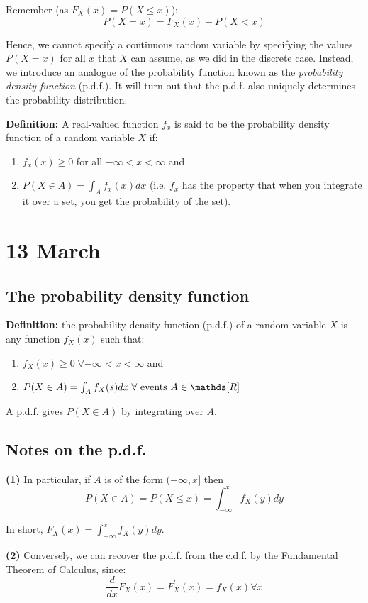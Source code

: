 \documentclass[12pt]{article}
\begin{document}
Remember (as $F_X (x) = P(X \leq x)$):
\[
    P(X=x) = F_X (x) - P(X < x)
\]

Hence, we cannot specify a continuous random variable by specifying the values $P(X=x)$ for all $x$ that $X$ can assume, as we did in the discrete case. Instead, we introduce an analogue of the probability function known as the \emph{probability density function} (p.d.f.). It will turn out that the p.d.f. also uniquely determines the probability distribution.

\textbf{Definition:} A real-valued function $f_x$ is said to be the probability density function of a random variable $X$ if:
\begin{enumerate}
    \item $f_x (x) \geq 0$ for all $- \infty < x < \infty$ and
    \item $P(X \in A) = \int_A f_x (x) dx$ (i.e. $f_x$ has the property that when you integrate it over a set, you get the probability of the set).
\end{enumerate}

\section{13 March}
\subsection{The probability density function}
\textbf{Definition:} the probability density function (p.d.f.) of a random variable $X$ is any function $f_X (x)$ such that:
\begin{enumerate}
    \item $f_X (x) \geq 0 \; \forall - \infty < x < \infty$ and
    \item $P(X \in A) = \int_A f_X (s) dx \; \forall \textnormal{ events } A \in \mathds[R]$
\end{enumerate}

A p.d.f. gives $P(X \in A)$ by integrating over $A$.

\subsection{Notes on the p.d.f.}
\textbf{(1)} In particular, if $A$ is of the form $(- \infty, x]$ then %
\[
    P(X \in A) = P(X \leq x) = \int_{-\infty}^{x} f_X (y) dy
\]

In short, $F_X (x) = \int_{-\infty}^{x} f_X (y) dy$.

\textbf{(2)} Conversely, we can recover the p.d.f. from the c.d.f. by the Fundamental Theorem of Calculus, since:
\[
    \frac{d}{dx} F_X (x) = F^\prime_X (x) = f_X (x) \forall x
\]
\end{document}
